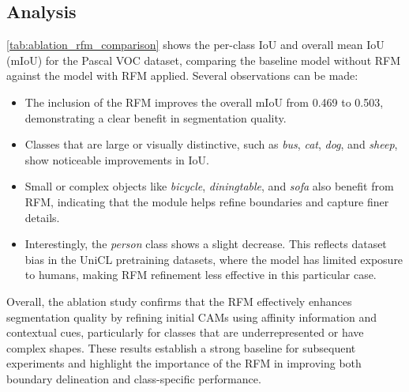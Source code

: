 \subsection{Analysis}

\autoref{tab:ablation_rfm_comparison} shows the per-class IoU and overall mean IoU (mIoU) for the Pascal VOC dataset, comparing the baseline model without RFM against the model with RFM applied. Several observations can be made:

\begin{itemize}
    \item The inclusion of the RFM improves the overall mIoU from 0.469 to 0.503, demonstrating a clear benefit in segmentation quality.
    \item Classes that are large or visually distinctive, such as \textit{bus}, \textit{cat}, \textit{dog}, and \textit{sheep}, show noticeable improvements in IoU.
    \item Small or complex objects like \textit{bicycle}, \textit{diningtable}, and \textit{sofa} also benefit from RFM, indicating that the module helps refine boundaries and capture finer details.
    \item Interestingly, the \textit{person} class shows a slight decrease. This reflects dataset bias in the UniCL pretraining datasets, where the model has limited exposure to humans, making RFM refinement less effective in this particular case.
\end{itemize}

Overall, the ablation study confirms that the RFM effectively enhances segmentation quality by refining initial CAMs using affinity information and contextual cues, particularly for classes that are underrepresented or have complex shapes. These results establish a strong baseline for subsequent experiments and highlight the importance of the RFM in improving both boundary delineation and class-specific performance.
